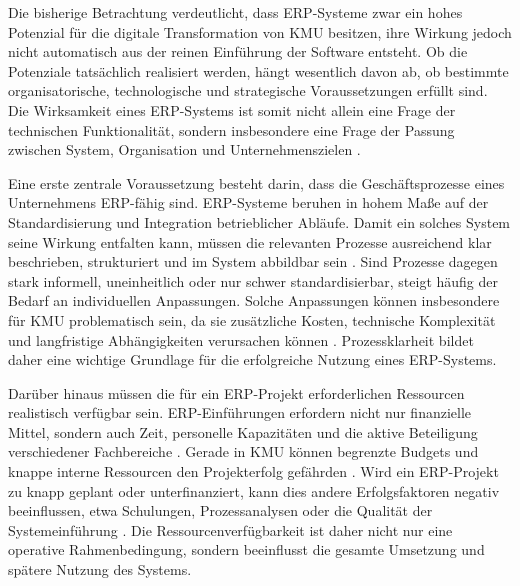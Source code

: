 
Die bisherige Betrachtung verdeutlicht, dass ERP-Systeme zwar ein hohes Potenzial für die digitale Transformation von 
KMU besitzen, ihre Wirkung jedoch nicht automatisch aus der reinen Einführung der Software entsteht. Ob die Potenziale tatsächlich realisiert 
werden, hängt wesentlich davon ab, ob bestimmte organisatorische, technologische und strategische Voraussetzungen 
erfüllt sind. Die Wirksamkeit eines ERP-Systems ist somit nicht allein eine Frage der technischen Funktionalität, 
sondern insbesondere eine Frage der Passung zwischen System, Organisation und Unternehmenszielen \parencite{Leyh2015,Alaskari2021,Leyh2019}.

Eine erste zentrale Voraussetzung besteht darin, dass die Geschäftsprozesse eines Unternehmens ERP-fähig sind. 
ERP-Systeme beruhen in hohem Maße auf der Standardisierung und Integration betrieblicher Abläufe. Damit ein solches 
System seine Wirkung entfalten kann, müssen die relevanten Prozesse ausreichend klar beschrieben, strukturiert und 
im System abbildbar sein \parencite{Leyh2019}. Sind Prozesse dagegen stark informell, uneinheitlich oder nur schwer standardisierbar, 
steigt häufig der Bedarf an individuellen Anpassungen. Solche Anpassungen können insbesondere für KMU problematisch 
sein, da sie zusätzliche Kosten, technische Komplexität und langfristige Abhängigkeiten verursachen können 
\parencite{Leyh2015}. Prozessklarheit bildet daher eine wichtige Grundlage für die erfolgreiche Nutzung eines ERP-Systems.


Darüber hinaus müssen die für ein ERP-Projekt erforderlichen Ressourcen realistisch verfügbar sein. ERP-Einführungen 
erfordern nicht nur finanzielle Mittel, sondern auch Zeit, personelle Kapazitäten und die aktive Beteiligung 
verschiedener Fachbereiche \parencite{Alaskari2021}. Gerade in KMU können begrenzte Budgets und knappe interne Ressourcen den Projekterfolg 
gefährden \parencite{Leyh2015}. Wird ein ERP-Projekt zu knapp geplant oder unterfinanziert, kann dies andere Erfolgsfaktoren negativ 
beeinflussen, etwa Schulungen, Prozessanalysen oder die Qualität der Systemeinführung \parencite{Xia2009,Barbieri2025}. 
Die Ressourcenverfügbarkeit ist daher nicht nur eine operative Rahmenbedingung, sondern beeinflusst die gesamte Umsetzung 
und spätere Nutzung des Systems.

